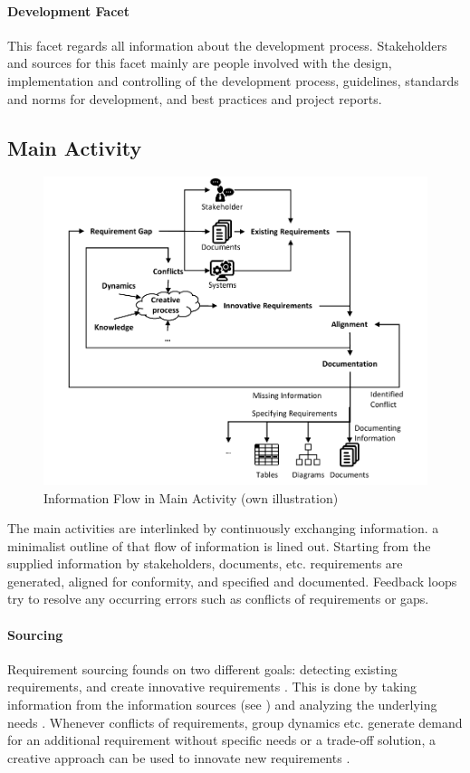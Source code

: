 \paragraph*{Development Facet}
This facet regards all information about the development process. Stakeholders and sources for this facet mainly are people involved with the design, implementation and controlling of the development process, guidelines, standards and norms for development, and best practices and project reports. \parencite[cf.][79]{Pohl.2007}
\subsection{Main Activity}
\begin{figure}[H]
    \centering
    \includegraphics[scale=1]{img/MainActivity.pdf}
    \caption[Information Flow in Main Activity of Requirements Engineering]{Information Flow in Main Activity  (own illustration)}
    \label{fig:infFlow}
\end{figure}
The main activities are interlinked by continuously exchanging information.  a minimalist outline of that flow of information is lined out. Starting from the supplied information by stakeholders, documents, etc. requirements are generated, aligned for conformity, and specified and documented. Feedback loops try to resolve any occurring errors such as conflicts of requirements or gaps.
\paragraph*{Sourcing}
Requirement sourcing founds on two different goals: detecting existing requirements, and create innovative requirements \parencite[cf.][318, 321]{Pohl.2007}. This is done by taking information from the information sources (see ) and analyzing the underlying needs \parencite[cf.][75-76]{Sommerville.2000}. Whenever conflicts of requirements, group dynamics etc. generate demand for an additional requirement without specific needs or a trade-off solution, a creative approach can be used to innovate new requirements \parencite[cf.][94]{Lauesen.2008}. 
